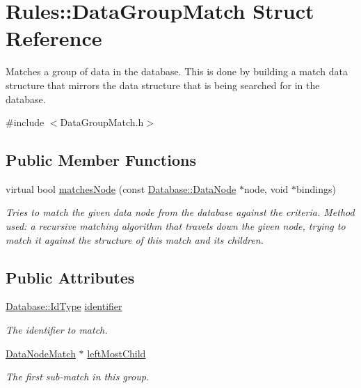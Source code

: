 \hypertarget{structRules_1_1DataGroupMatch}{}\section{Rules\+:\+:Data\+Group\+Match Struct Reference}
\label{structRules_1_1DataGroupMatch}


Matches a group of data in the database. This is done by building a match data structure that mirrors the data structure that is being searched for in the database.  




{\ttfamily \#include $<$Data\+Group\+Match.\+h$>$}

\subsection*{Public Member Functions}
\begin{DoxyCompactItemize}
\item 
virtual bool \hyperlink{structRules_1_1DataGroupMatch_afe0f2d2d965ead95d330095591b9d830}{matches\+Node} (const \hyperlink{classDatabase_1_1DataNode}{Database\+::\+Data\+Node} $\ast$node, void $\ast$bindings)
\begin{DoxyCompactList}\small\item\em Tries to match the given data node from the database against the criteria. Method used\+: a recursive matching algorithm that travels down the given node, trying to match it against the structure of this match and its children. \end{DoxyCompactList}\end{DoxyCompactItemize}
\subsection*{Public Attributes}
\begin{DoxyCompactItemize}
\item 
\hyperlink{namespaceDatabase_abca840aa37b2fd02e1d82e32a8171437}{Database\+::\+Id\+Type} \hyperlink{structRules_1_1DataGroupMatch_a8ff473135e5a803c36cd8b2b23296da3}{identifier}\hypertarget{structRules_1_1DataGroupMatch_a8ff473135e5a803c36cd8b2b23296da3}{}\label{structRules_1_1DataGroupMatch_a8ff473135e5a803c36cd8b2b23296da3}

\begin{DoxyCompactList}\small\item\em The identifier to match. \end{DoxyCompactList}\item 
\hyperlink{structRules_1_1DataNodeMatch}{Data\+Node\+Match} $\ast$ \hyperlink{structRules_1_1DataGroupMatch_a3dd32fca397944ef759c6f236548077a}{left\+Most\+Child}\hypertarget{structRules_1_1DataGroupMatch_a3dd32fca397944ef759c6f236548077a}{}\label{structRules_1_1DataGroupMatch_a3dd32fca397944ef759c6f236548077a}

\begin{DoxyCompactList}\small\item\em The first sub-\/match in this group. \end{DoxyCompactList}\end{DoxyCompactItemize}


